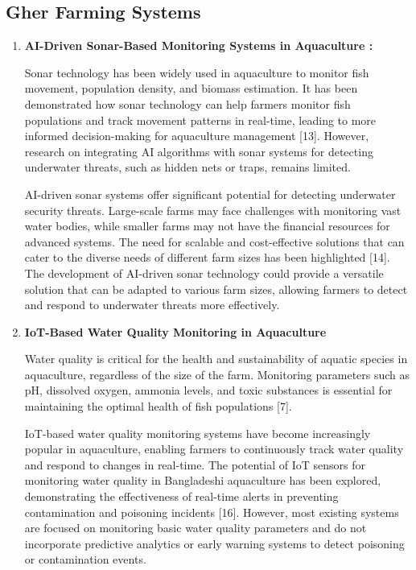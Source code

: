 \documentclass[conference]{IEEEtran}
\begin{document}
\subsection{\textbf{Gher Farming Systems}}
\begin{enumerate}
	\item \textbf{AI-Driven Sonar-Based Monitoring Systems in Aquaculture : }
	
Sonar technology has been widely used in aquaculture to monitor fish movement, population density, and biomass estimation. It has been demonstrated how sonar technology can help farmers monitor fish populations and track movement patterns in real-time, leading to more informed decision-making for aquaculture management [13]. However, research on integrating AI algorithms with sonar systems for detecting underwater threats, such as hidden nets or traps, remains limited.

AI-driven sonar systems offer significant potential for detecting underwater security threats. Large-scale farms may face challenges with monitoring vast water bodies, while smaller farms may not have the financial resources for advanced systems. The need for scalable and cost-effective solutions that can cater to the diverse needs of different farm sizes has been highlighted [14]. The development of AI-driven sonar technology could provide a versatile solution that can be adapted to various farm sizes, allowing farmers to detect and respond to underwater threats more effectively.


	\item \textbf{IoT-Based Water Quality Monitoring in Aquaculture}
	
	Water quality is critical for the health and sustainability of aquatic species in aquaculture, regardless of the size of the farm. Monitoring parameters such as pH, dissolved oxygen, ammonia levels, and toxic substances is essential for maintaining the optimal health of fish populations [7].

IoT-based water quality monitoring systems have become increasingly popular in aquaculture, enabling farmers to continuously track water quality and respond to changes in real-time. The potential of IoT sensors for monitoring water quality in Bangladeshi aquaculture has been explored, demonstrating the effectiveness of real-time alerts in preventing contamination and poisoning incidents [16]. However, most existing systems are focused on monitoring basic water quality parameters and do not incorporate predictive analytics or early warning systems to detect poisoning or contamination events.


\end{enumerate}
\end{document}
